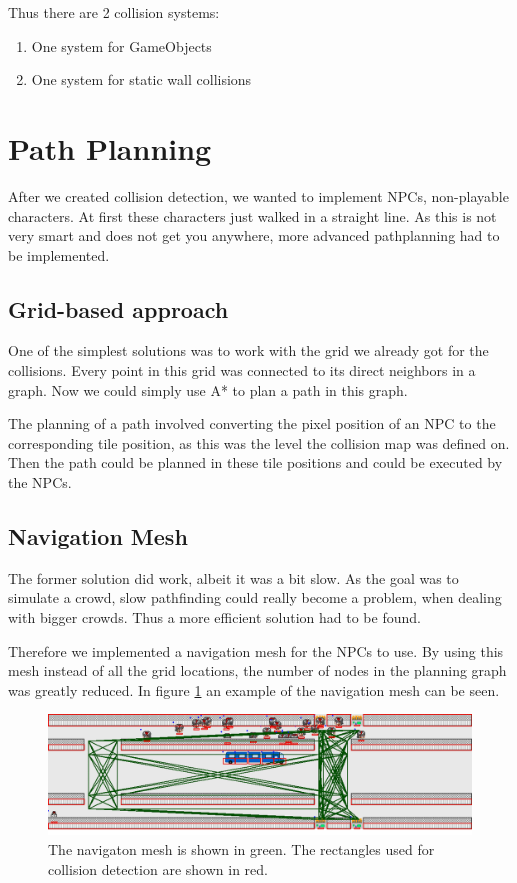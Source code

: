 \documentclass[a4paper,pdf,12pt]{article}
\begin{document}
Thus there are 2 collision systems:
\begin{enumerate}
\item One system for GameObjects
\item One system for static wall collisions
\end{enumerate}

\section{Path Planning}
\label{sec:Path Planning}

After we created collision detection, we wanted to implement NPCs, non-playable characters. At first these characters just walked in a straight line. As this is not very smart and does not get you anywhere, more advanced pathplanning had to be implemented. 

\subsection{Grid-based approach}
One of the simplest solutions was to work with the grid we already got for the collisions. Every point in this grid was connected to its direct neighbors in a graph. Now we could simply use A* to plan a path in this graph. 

The planning of a path involved converting the pixel position of an NPC to the corresponding tile position, as this was the level the collision map was defined on. Then the path could be planned in these tile positions and could be executed by the NPCs.

\subsection{Navigation Mesh}
The former solution did work, albeit it was a bit slow. As the goal was to simulate a crowd, slow pathfinding could really become a problem, when dealing with bigger crowds. Thus a more efficient solution had to be found.

Therefore we implemented a navigation mesh for the NPCs to use. By using this mesh instead of all the grid locations, the number of nodes in the planning graph was greatly reduced. In figure \ref{fig:mesh} an example of the navigation mesh can be seen. 

\begin{figure}[h!]
\centering
\includegraphics[width = 1.0 \textwidth]{../screenshots/screenshot_16920.png}
\caption{The navigaton mesh is shown in green. The rectangles used for collision detection are shown in red.}
\label{fig:mesh}
\end{figure}
\end{document}

